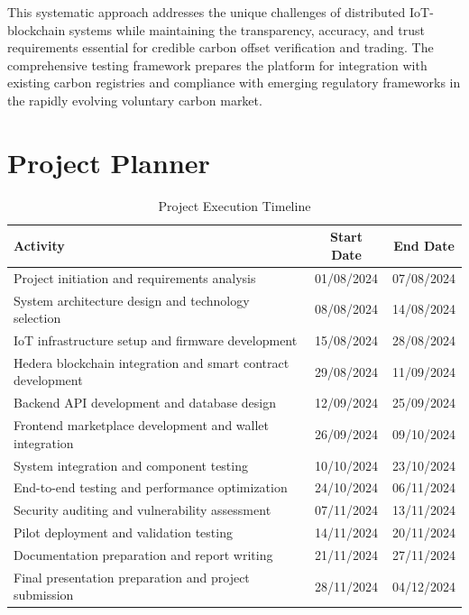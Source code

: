 \documentclass[oneside,a4paper,12pt]{book}
\renewcommand{\arraystretch}{1.5}
\begin{document}
\begin{appendices}
This systematic approach addresses the unique challenges of distributed IoT-blockchain systems while maintaining the transparency, accuracy, and trust requirements essential for credible carbon offset verification and trading. The comprehensive testing framework prepares the platform for integration with existing carbon registries and compliance with emerging regulatory frameworks in the rapidly evolving voluntary carbon market.


\chapter{Project Planner}
\label{app:plan}

\begin{table}[H]
\centering
\renewcommand{\arraystretch}{1.5}
\setlength{\tabcolsep}{8pt}
\begin{tabular}{|p{6cm}|c|c|}
\hline
\textbf{Activity} & \textbf{Start Date} & \textbf{End Date} \\
\hline
Project initiation and requirements analysis & 01/08/2024 & 07/08/2024 \\
\hline
System architecture design and technology selection & 08/08/2024 & 14/08/2024 \\
\hline
IoT infrastructure setup and firmware development & 15/08/2024 & 28/08/2024 \\
\hline
Hedera blockchain integration and smart contract development & 29/08/2024 & 11/09/2024 \\
\hline
Backend API development and database design & 12/09/2024 & 25/09/2024 \\
\hline
Frontend marketplace development and wallet integration & 26/09/2024 & 09/10/2024 \\
\hline
System integration and component testing & 10/10/2024 & 23/10/2024 \\
\hline
End-to-end testing and performance optimization & 24/10/2024 & 06/11/2024 \\
\hline
Security auditing and vulnerability assessment & 07/11/2024 & 13/11/2024 \\
\hline
Pilot deployment and validation testing & 14/11/2024 & 20/11/2024 \\
\hline
Documentation preparation and report writing & 21/11/2024 & 27/11/2024 \\
\hline
Final presentation preparation and project submission & 28/11/2024 & 04/12/2024 \\
\hline
\end{tabular}
\caption{Project Execution Timeline}
\label{fig:plan_execution}
\end{table}


\end{appendices}
\end{document}
